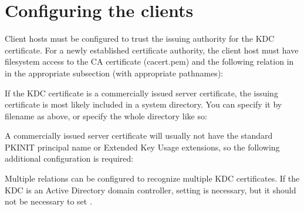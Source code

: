 \documentclass[letterpaper,10pt,english]{sphinxmanual}
\begin{document}
\section{Configuring the clients}
\label{\detokenize{admin/pkinit:configuring-the-clients}}
\sphinxAtStartPar
Client hosts must be configured to trust the issuing authority for the
KDC certificate.  For a newly established certificate authority, the
client host must have filesystem access to the CA certificate
(cacert.pem) and the following relation in {\hyperref[\detokenize{admin/conf_files/krb5_conf:krb5-conf-5}]{}} in the
appropriate {\hyperref[\detokenize{admin/conf_files/krb5_conf:realms}]{}} subsection (with appropriate pathnames):

\begin{sphinxVerbatim}[commandchars=\\\{\}]
  
\end{sphinxVerbatim}

\sphinxAtStartPar
If the KDC certificate is a commercially issued server certificate,
the issuing certificate is most likely included in a system directory.
You can specify it by filename as above, or specify the whole
directory like so:

\begin{sphinxVerbatim}[commandchars=\\\{\}]
  
\end{sphinxVerbatim}

\sphinxAtStartPar
A commercially issued server certificate will usually not have the
standard PKINIT principal name or Extended Key Usage extensions, so
the following additional configuration is required:

\begin{sphinxVerbatim}[commandchars=\\\{\}]
  
  
\end{sphinxVerbatim}

\sphinxAtStartPar
Multiple  relations can be configured to
recognize multiple KDC certificates.  If the KDC is an Active
Directory domain controller, setting  is
necessary, but it should not be necessary to set
.
\end{document}
